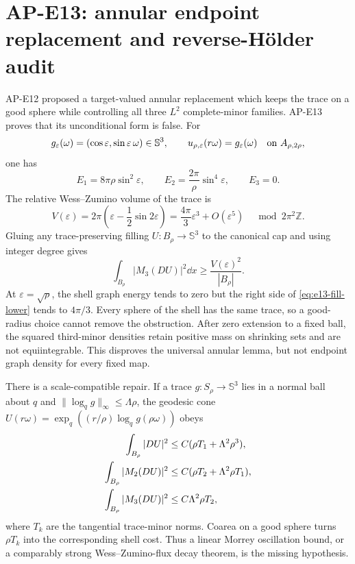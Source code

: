 \section{AP-E13: annular endpoint replacement and reverse-H\"older audit}

AP-E12 proposed a target-valued annular replacement which keeps the trace on
a good sphere while controlling all three $L^2$ complete-minor families.
AP-E13 proves that its unconditional form is false.  For
\begin{equation}
 g_\varepsilon(\omega)=(\cos\varepsilon,\sin\varepsilon\,\omega)
 \in\mathbb S^3,
 \qquad
 u_{\rho,\varepsilon}(r\omega)=g_\varepsilon(\omega)
 \quad\hbox{on }A_{\rho,2\rho},
 \label{eq:e13-cap-trace}
\end{equation}
one has
\begin{equation}
 E_1=8\pi\rho\sin^2\varepsilon,\qquad
 E_2=\frac{2\pi}{\rho}\sin^4\varepsilon,\qquad E_3=0.
 \label{eq:e13-shell}
\end{equation}
The relative Wess--Zumino volume of the trace is
\begin{equation}
 V(\varepsilon)=2\pi\left(\varepsilon-\frac{1}{2}\sin2\varepsilon\right)
 =\frac{4\pi}{3}\varepsilon^3+O(\varepsilon^5)
 \quad\bmod 2\pi^2\mathbb Z.
 \label{eq:e13-wz}
\end{equation}
Gluing any trace-preserving filling $U:B_\rho\to\mathbb S^3$ to the canonical cap
and using integer degree gives
\begin{equation}
 \int_{B_\rho}|M_3(DU)|^2\dd x
 \geq\frac{V(\varepsilon)^2}{|B_\rho|}.
 \label{eq:e13-fill-lower}
\end{equation}
At $\varepsilon=\sqrt\rho$, the shell graph energy tends to zero but the
right side of \eqref{eq:e13-fill-lower} tends to $4\pi/3$.  Every sphere of
the shell has the same trace, so a good-radius choice cannot remove the
obstruction.  After zero extension to a fixed ball, the squared third-minor
densities retain positive mass on shrinking sets and are not equiintegrable.
This disproves the universal annular lemma, but not endpoint graph density
for every fixed map.

There is a scale-compatible repair.  If a trace $g:S_\rho\to\mathbb S^3$ lies in
a normal ball about $q$ and
$\|\log_qg\|_\infty\leq\Lambda\rho$, the geodesic cone
$U(r\omega)=\exp_q((r/\rho)\log_qg(\rho\omega))$ obeys
\begin{align}
 \int_{B_\rho}|DU|^2&\leq C(\rho T_1+\Lambda^2\rho^3),\notag\\
 \int_{B_\rho}|M_2(DU)|^2&\leq
 C(\rho T_2+\Lambda^2\rho T_1),\notag\\
 \int_{B_\rho}|M_3(DU)|^2&\leq C\Lambda^2\rho T_2,
 \label{eq:e13-conditional}
\end{align}
where $T_k$ are the tangential trace-minor norms.  Coarea on a good sphere
turns $\rho T_k$ into the corresponding shell cost.  Thus a linear Morrey
oscillation bound, or a comparably strong Wess--Zumino-flux decay theorem, is
the missing hypothesis.

